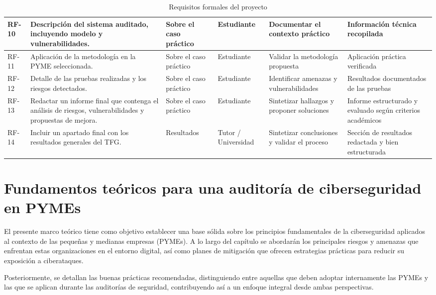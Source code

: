 \documentclass[a4paper, 11pt]{article}
\begin{document}
\begin{landscape}
\begin{table}
\begin{tabular}{|p{1cm}|p{6cm}|p{2.5cm}|p{2.7cm}|p{3.2cm}|p{4.9cm}|}
\hline
RF-10 & Descripción del sistema auditado, incluyendo modelo y vulnerabilidades. & Sobre el caso práctico & Estudiante & Documentar el contexto práctico & Información técnica recopilada \\
\hline
RF-11 & Aplicación de la metodología en la PYME seleccionada. & Sobre el caso práctico & Estudiante & Validar la metodología propuesta & Aplicación práctica verificada \\
\hline
RF-12 & Detalle de las pruebas realizadas y los riesgos detectados. & Sobre el caso práctico & Estudiante & Identificar amenazas y vulnerabilidades & Resultados documentados de las pruebas \\
\hline
RF-13 & Redactar un informe final que contenga el análisis de riesgos, vulnerabilidades y propuestas de mejora. & Sobre el caso práctico & Estudiante & Sintetizar hallazgos y proponer soluciones & Informe estructurado y evaluado según criterios académicos \\
\hline
RF-14 & Incluir un apartado final con los resultados generales del TFG. & Resultados & Tutor / Universidad & Sintetizar conclusiones y validar el proceso & Sección de resultados redactada y bien estructurada \\
\hline
\end{tabular}
\caption{Requisitos formales del proyecto}
\label{tab:requisitos_formales}
\vspace{0.2cm}
\end{table}
\end{landscape}

\clearpage
\thispagestyle{nohead}



\section{Fundamentos teóricos para una auditoría de ciberseguridad en PYMEs}

El presente marco teórico tiene como objetivo establecer una base sólida sobre los principios fundamentales de la ciberseguridad aplicados al contexto de las pequeñas y medianas empresas (PYMEs). A lo largo del capítulo se abordarán los principales riesgos y amenazas que enfrentan estas organizaciones en el entorno digital, así como planes de mitigación que ofrecen estrategias prácticas para reducir su exposición a ciberataques.

Posteriormente, se detallan las buenas prácticas recomendadas, distinguiendo entre aquellas que deben adoptar internamente las PYMEs y las que se aplican durante las auditorías de seguridad, contribuyendo así a un enfoque integral desde ambas perspectivas.
\end{document}
